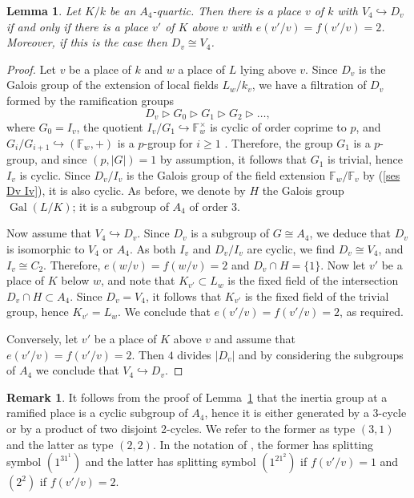 \documentclass{amsart}
\numberwithin{equation}{section} \numberwithin{figure}{section}
\DeclareMathOperator{\Gal}{Gal} \DeclareMathOperator{\NS}{NS}
\theoremstyle{one}
\newtheorem{lemma}[theorem]{\textbf{Lemma}}
\theoremstyle{definition}
\newtheorem{remark}[theorem]{Remark}
\begin{document}
\begin{lemma}\label{lem: splitting conditions}
Let $K/k$ be an $A_4$-quartic. Then there is a place $v$ of $k$ with $V_4\hookrightarrow D_v$ if and only if there is a place $v'$ of $K$ above $v$ with $e(v'/v)=f(v'/v)=2$. Moreover, if this is the case
then $D_v\cong V_4$. 
\end{lemma}
\begin{proof}
Let $v$ be a place of $k$ and $w$ a place of $L$ lying above $v$. Since $D_v$ is the Galois group of the extension of local fields $L_w/k_v$, we have a filtration of $D_v$ formed by the ramification groups 
$$D_v\rhd G_0\rhd G_1\rhd G_2\rhd\ldots,$$
where $G_0=I_v$, the quotient $I_v/G_1\hookrightarrow \mathbb{F}_{w}^\times$ is cyclic of order coprime to $p$, and $G_i/G_{i+1}\hookrightarrow (\mathbb{F}_{w},+)$ 
is a $p$-group for $i\geq1$ \cite[Prop. II.10.2]{neu:99}. Therefore, the group $G_1$ is a $p$-group, and since $(p,|G|)=1$ by assumption, it follows that $G_1$ is trivial, hence $I_{v}$ is cyclic. Since $D_{v}/I_{v}$ is the Galois group of the field extension $\mathbb{F}_{w}/\mathbb{F}_{v}$  
by (\ref{ses Dv Iv}), it is also cyclic.
As before, we denote by $H$ the Galois group $\Gal(L/K)$; it is a subgroup of $A_4$ of order $3$.

Now assume that $V_4\hookrightarrow D_v$. Since $D_v$ is a subgroup of $G\cong A_4$, we deduce that $D_v$ is isomorphic to $V_4$ or $A_4$. 
As both $I_v$ and $D_v/I_v$ are cyclic, we find $D_v\cong V_4$, and $I_v\cong C_2$. Therefore, $e(w/v)=f(w/v)=2$ and $D_v\cap H=\{1\}$. 
Now let $v'$ be a place of $K$ below $w$, and note that $K_{v'}\subset L_w$ is the fixed field of the intersection $D_v\cap H\subset A_4$. Since $D_v=V_4$, it follows that $K_{v'}$ is the fixed field of the trivial group, hence $K_{v'}=L_w$. We conclude that $e(v'/v)=f(v'/v)=2$, as required. 

Conversely, let $v'$ be a place of $K$ above $v$ and assume that $e(v'/v)=f(v'/v)=2$. Then $4$ divides $|D_v|$ and by considering the subgroups of $A_4$ we conclude that $V_4\hookrightarrow D_v$.
\end{proof}

\begin{remark}\label{rem:ef}
  It follows from the proof of Lemma~\ref{lem: splitting conditions} that the inertia group at a ramified place is a cyclic subgroup of $A_4$, hence it is either generated by a $3$-cycle or by a product of two disjoint 2-cycles. We refer to the former as type $(3,1)$ and the latter as type $(2,2)$.  In the notation of \cite[\S~2]{bha:07}, the former has splitting symbol \((1^31^{1})\) and the latter has splitting symbol \((1^21^2)\) if \(f(v'/v) = 1\) and \((2^2)\) if \(f(v'/v)=2\). 
\end{remark}
\end{document}
